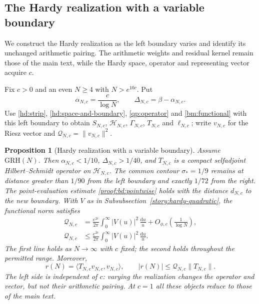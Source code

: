 \documentclass[12pt,a4paper]{amsart}
\numberwithin{equation}{section}
\def\le{\leqslant}
\def\ge{\geqslant}
\theoremstyle{plain}
\newtheorem{proposition}{Proposition}[section]
\theoremstyle{definition}
\theoremstyle{remark}
\begin{document}
\subsection{The Hardy realization with a variable boundary}
\label{proof:app:param:realization}

We construct the Hardy realization as the left boundary varies
and identify its unchanged arithmetic pairing. The arithmetic
weights and residual kernel remain those of the main text, while
the Hardy space, operator and representing vector acquire $c$.

Fix $c>0$ and an even $N\ge4$ with $N>e^{10c}$. Put
\begin{equation}\label{proof:app:param:strip}
 \alpha_{N,c}=\frac{c}{\log N},\qquad
 \Delta_{N,c}=\beta-\alpha_{N,c}.
\end{equation}
Use \eqref{hd:strip}, \eqref{hd:space-and-boundary}, \eqref{qp:operator} and
\eqref{bm:functional} with this left boundary to obtain
$S_{N,c}$, $\mathcal H_{N,c}$, $\Gamma_{N,c}$, $T_{N,c}$ and
$\ell_{N,c}$; write $v_{N,c}$ for the Riesz vector and
$\mathcal Q_{N,c}=\|v_{N,c}\|^2$.

\begin{proposition}[Hardy realization with a variable boundary]
\label{proof:v9:variable-boundary-realization}
Assume $\mathrm{GRH}(N)$. Then $\alpha_{N,c}<1/10$,
$\Delta_{N,c}>1/40$, and $T_{N,c}$ is a compact selfadjoint
Hilbert--Schmidt operator on $\mathcal H_{N,c}$.
The common contour $\sigma_*=1/9$ remains at distance greater
than $1/90$ from the left boundary and exactly $1/72$ from the right.
The point-evaluation estimate \eqref{proof:bd:pointwise}
holds with the distance $d_{N,c}$ to the new boundary.
With $V$ as in Subsubsection~\ref{story:hardy-quadratic},
the functional norm satisfies
\begin{equation}\label{proof:app:param:functional-norm}
 \begin{aligned}
 \mathcal Q_{N,c}
 &=\frac{e^{2c}}{2\pi}\int_0^\infty |V(u)|^2\,\frac{\mathrm{d}u}{u}
       +O_{\phi,c}\!\left(\frac1{\log N}\right),\\
 \mathcal Q_{N,c}
 &\le\frac{e^{2c}}{2\pi}\int_0^\infty |V(u)|^2\,\frac{\mathrm{d}u}{u}.
 \end{aligned}
\end{equation}
The first line holds as $N\to\infty$ with $c$ fixed; the second
holds throughout the permitted range. Moreover,
\begin{equation}\label{proof:app:param:quadratic-form}
 r(N)=\langle T_{N,c}v_{N,c},v_{N,c}\rangle,\qquad
 |r(N)|\le\mathcal Q_{N,c}\|T_{N,c}\|.
\end{equation}
The left side is independent of $c$: varying the realization
changes the operator and vector, but not their arithmetic pairing.
At $c=1$ all these objects reduce to those of the main text.
\end{proposition}
\end{document}
